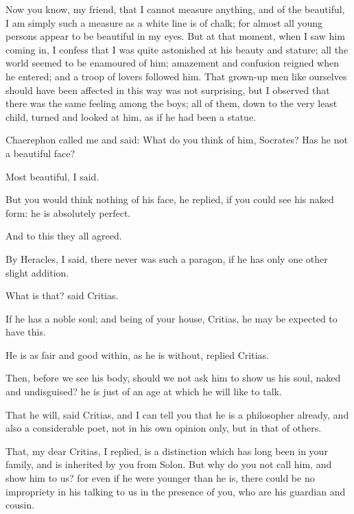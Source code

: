 \documentclass[11pt,letter]{article}
\begin{document}
\par  Now you know, my friend, that I cannot measure anything, and of the beautiful, I am simply such a measure as a white line is of chalk; for almost all young persons appear to be beautiful in my eyes. But at that moment, when I saw him coming in, I confess that I was quite astonished at his beauty and stature; all the world seemed to be enamoured of him; amazement and confusion reigned when he entered; and a troop of lovers followed him. That grown-up men like ourselves should have been affected in this way was not surprising, but I observed that there was the same feeling among the boys; all of them, down to the very least child, turned and looked at him, as if he had been a statue.

\par  Chaerephon called me and said: What do you think of him, Socrates? Has he not a beautiful face?

\par  Most beautiful, I said.

\par  But you would think nothing of his face, he replied, if you could see his naked form: he is absolutely perfect.

\par  And to this they all agreed.

\par  By Heracles, I said, there never was such a paragon, if he has only one other slight addition.

\par  What is that? said Critias.

\par  If he has a noble soul; and being of your house, Critias, he may be expected to have this.

\par  He is as fair and good within, as he is without, replied Critias.

\par  Then, before we see his body, should we not ask him to show us his soul, naked and undisguised? he is just of an age at which he will like to talk.

\par  That he will, said Critias, and I can tell you that he is a philosopher already, and also a considerable poet, not in his own opinion only, but in that of others.

\par  That, my dear Critias, I replied, is a distinction which has long been in your family, and is inherited by you from Solon. But why do you not call him, and show him to us? for even if he were younger than he is, there could be no impropriety in his talking to us in the presence of you, who are his guardian and cousin.
\end{document}
